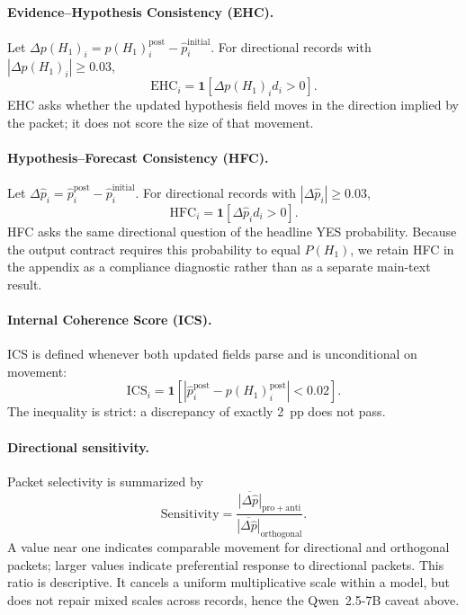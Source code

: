 \paragraph{Evidence--Hypothesis Consistency (EHC).}
Let \(\Delta p(H_1)_i=p(H_1)_i^{\mathrm{post}}-\hat p_i^{\mathrm{initial}}\).
For directional records with \(|\Delta p(H_1)_i|\geq0.03\),
\begin{equation}
  \mathrm{EHC}_i=\mathbf{1}\!\left[\Delta p(H_1)_i d_i>0\right].
  \label{eq:ehc}
\end{equation}
EHC asks whether the updated hypothesis field moves in the direction implied by the
packet; it does not score the size of that movement.

\paragraph{Hypothesis--Forecast Consistency (HFC).}
Let \(\Delta\hat p_i=\hat p_i^{\mathrm{post}}-\hat p_i^{\mathrm{initial}}\).
For directional records with \(|\Delta\hat p_i|\geq0.03\),
\begin{equation}
  \mathrm{HFC}_i=\mathbf{1}\!\left[\Delta\hat p_i d_i>0\right].
  \label{eq:hfc}
\end{equation}
HFC asks the same directional question of the headline YES probability. Because
the output contract requires this probability to equal $P(H_1)$, we retain HFC in
the appendix as a compliance diagnostic rather than as a separate main-text result.

\paragraph{Internal Coherence Score (ICS).}
ICS is defined whenever both updated fields parse and is unconditional on movement:
\begin{equation}
  \mathrm{ICS}_i=\mathbf{1}\!\left[
  \left|\hat p_i^{\mathrm{post}}-p(H_1)_i^{\mathrm{post}}\right|<0.02\right].
  \label{eq:ics}
\end{equation}
The inequality is strict: a discrepancy of exactly 2~pp does not pass.

\paragraph{Directional sensitivity.}
Packet selectivity is summarized by
\begin{equation}
  \mathrm{Sensitivity}=
  \frac{\overline{|\Delta\hat p|}_{\mathrm{pro}+\mathrm{anti}}}
       {\overline{|\Delta\hat p|}_{\mathrm{orthogonal}}}.
  \label{eq:sensitivity}
\end{equation}
A value near one indicates comparable movement for directional and orthogonal
packets; larger values indicate preferential response to directional packets. This
ratio is descriptive.  It cancels a uniform multiplicative scale within a model, but
does not repair mixed scales across records, hence the Qwen~2.5-7B caveat above.

